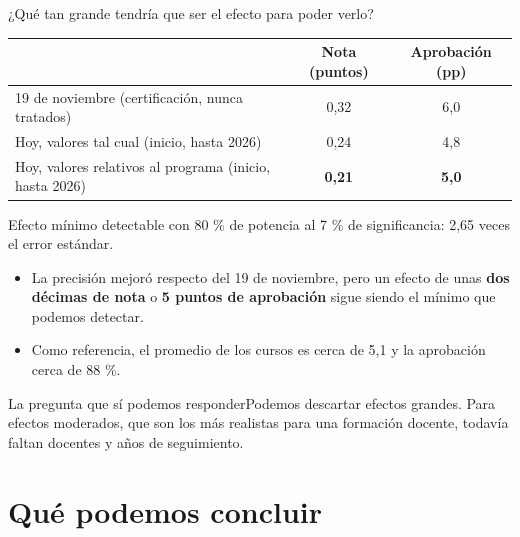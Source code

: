 \documentclass[10pt,aspectratio=169]{beamer}
\newcommand{\sintesis}[2]{%
  \begin{block}{#1}#2\end{block}}
\begin{document}
\begin{frame}{¿Qué tan grande tendría que ser el efecto para poder verlo?}
  \begin{table}\small
    \begin{tabular}{lcc}
      \toprule
      & Nota (puntos) & Aprobación (pp) \\
      \midrule
      19 de noviembre (certificación, nunca tratados) & 0,32 & 6,0 \\
      Hoy, valores tal cual (inicio, hasta 2026) & 0,24 & 4,8 \\
      Hoy, valores relativos al programa (inicio, hasta 2026) & \textbf{0,21} & \textbf{5,0} \\
      \bottomrule
    \end{tabular}
  \end{table}
  {\scriptsize Efecto mínimo detectable con 80 \% de potencia al 7 \% de significancia: 2,65 veces el error estándar.}
  \vspace{0.4em}
  \begin{itemize}
    \item La precisión mejoró respecto del 19 de noviembre, pero un efecto de unas \textbf{dos décimas de nota} o \textbf{5 puntos de aprobación} sigue siendo el mínimo que podemos detectar.
    \item Como referencia, el promedio de los cursos es cerca de 5,1 y la aprobación cerca de 88 \%.
  \end{itemize}
  \sintesis{La pregunta que sí podemos responder}{Podemos descartar efectos grandes. Para efectos moderados, que son los más realistas para una formación docente, todavía faltan docentes y años de seguimiento.}
\end{frame}

\section{Qué podemos concluir}
\end{document}
